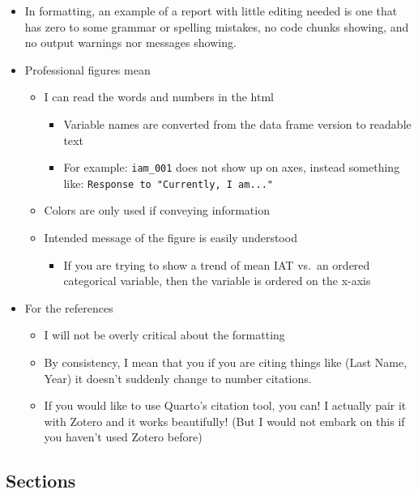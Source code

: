 \documentclass[
  letterpaper,
  DIV=11,
  numbers=noendperiod]{scrartcl}
\providecommand{\tightlist}{%
  \setlength{\itemsep}{0pt}\setlength{\parskip}{0pt}}\usepackage{longtable,booktabs,array}
\begin{document}
\begin{itemize}
\item
  In formatting, an example of a report with little editing needed is
  one that has zero to some grammar or spelling mistakes, no code chunks
  showing, and no output warnings nor messages showing.
\item
  Professional figures mean

  \begin{itemize}
  \item
    I can read the words and numbers in the html

    \begin{itemize}
    \item
      Variable names are converted from the data frame version to
      readable text
    \item
      For example: \texttt{iam\_001} does not show up on axes, instead
      something like: \texttt{Response\ to\ "Currently,\ I\ am..."}
    \end{itemize}
  \item
    Colors are only used if conveying information
  \item
    Intended message of the figure is easily understood

    \begin{itemize}
    \tightlist
    \item
      If you are trying to show a trend of mean IAT vs.~an ordered
      categorical variable, then the variable is ordered on the x-axis
    \end{itemize}
  \end{itemize}
\item
  For the references

  \begin{itemize}
  \item
    I will not be overly critical about the formatting
  \item
    By consistency, I mean that you if you are citing things like (Last
    Name, Year) it doesn't suddenly change to number citations.
  \item
    If you would like to use Quarto's citation tool, you can! I actually
    pair it with Zotero and it works beautifully! (But I would not
    embark on this if you haven't used Zotero before)
  \end{itemize}
\end{itemize}

\hypertarget{sections}{%
\subsection{Sections}\label{sections}}
\end{document}
